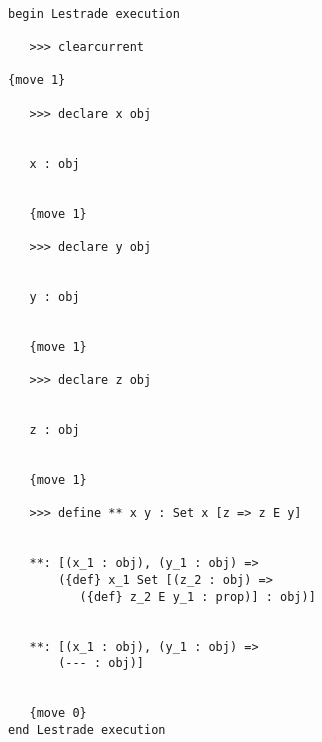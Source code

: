 \documentclass[12pt]{article}
\begin{document}
\begin{verbatim}

begin Lestrade execution

   >>> clearcurrent

{move 1}

   >>> declare x obj


   x : obj


   {move 1}

   >>> declare y obj


   y : obj


   {move 1}

   >>> declare z obj


   z : obj


   {move 1}

   >>> define ** x y : Set x [z => z E y]


   **: [(x_1 : obj), (y_1 : obj) => 
       ({def} x_1 Set [(z_2 : obj) => 
          ({def} z_2 E y_1 : prop)] : obj)]


   **: [(x_1 : obj), (y_1 : obj) => 
       (--- : obj)]


   {move 0}
end Lestrade execution
\end{verbatim}
\end{document}
